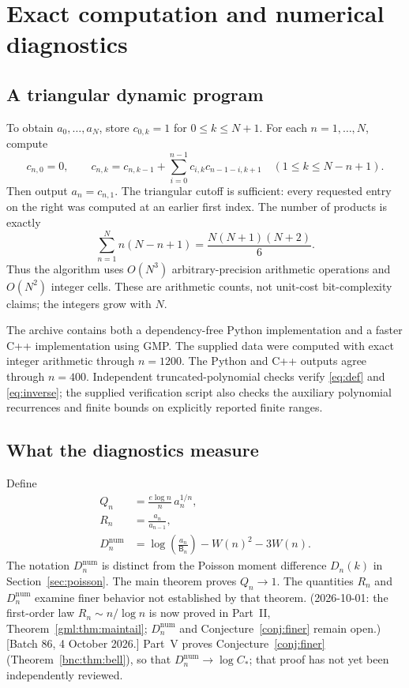 \documentclass[11pt]{article}
\numberwithin{equation}{section}
\theoremstyle{definition}
\theoremstyle{remark}
\begin{document}
\section{Exact computation and numerical diagnostics}\label{sec:numerics}

\subsection{A triangular dynamic program}

To obtain $a_0,\ldots,a_N$, store $c_{0,k}=1$ for $0\le k\le N+1$.
For each $n=1,\ldots,N$, compute
\[
 c_{n,0}=0,\qquad
 c_{n,k}=c_{n,k-1}+\sum_{i=0}^{n-1}c_{i,k}c_{n-1-i,k+1}
 \quad(1\le k\le N-n+1).
\]
Then output $a_n=c_{n,1}$. The triangular cutoff is sufficient: every
requested entry on the right was computed at an earlier first index.
The number of products is exactly
\[
 \sum_{n=1}^N n(N-n+1)=\frac{N(N+1)(N+2)}6.
\]
Thus the algorithm uses $O(N^3)$ arbitrary-precision arithmetic
operations and $O(N^2)$ integer cells. These are arithmetic counts, not
unit-cost bit-complexity claims; the integers grow with $N$.

The archive contains both a dependency-free Python implementation and
a faster C++ implementation using GMP. The supplied data were computed
with exact integer arithmetic through $n=1200$. The Python and C++
outputs agree through $n=400$. Independent truncated-polynomial checks
verify \eqref{eq:def} and \eqref{eq:inverse}; the supplied verification
script also checks the auxiliary polynomial recurrences and finite
bounds on explicitly reported finite ranges.

\subsection{What the diagnostics measure}

Define
\begin{align}
 Q_n&=\frac{e\log n}{n}\,a_n^{1/n},\label{eq:Q}\\
 R_n&=\frac{a_n}{a_{n-1}},\label{eq:R}\\
 D_n^{\mathrm{num}}
 &=\log\left(\frac{a_n}{\mathsf B_n}\right)-W(n)^2-3W(n).
 \label{eq:Dnum}
\end{align}
The notation $D_n^{\mathrm{num}}$ is distinct from the Poisson moment
difference $D_n(k)$ in Section~\ref{sec:poisson}. The main theorem proves
$Q_n\to1$. The quantities $R_n$ and $D_n^{\mathrm{num}}$ examine finer
behavior not established by that theorem. (2026-10-01: the first-order
law $R_n\sim n/\log n$ is now proved in Part~II,
Theorem~\ref{gml:thm:maintail}; $D_n^{\mathrm{num}}$ and
Conjecture~\ref{conj:finer} remain open.) [Batch 86, 4 October 2026.] Part~V proves
Conjecture~\ref{conj:finer} (Theorem~\ref{bnc:thm:bell}), so that
$D_n^{\mathrm{num}}\to\log C_*$; that proof has not yet been
independently reviewed.
\end{document}
